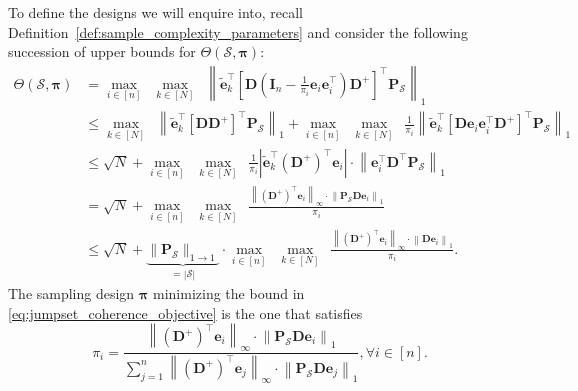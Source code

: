 To define the designs we will enquire into, recall Definition~\ref{def:sample_complexity_parameters} and consider the following succession of upper bounds for $\Theta(\mathcal{S}, \bm{\pi})$:
\begin{align}
    \Theta (\mathcal{S}, \bm{\pi}) & = \underset{i \in [n]}{\max} \enspace \underset{k \in [N]}{\max} \enspace \left \| \tilde{\mathbf{e}}_k^{\top} \left [ \mathbf{D} \left ( \mathbf{I}_n - \frac{1}{\pi_{i}}\mathbf{e}_{i} \mathbf{e}_{i}^\top \right ) \mathbf{D}^{+} \right ]^\top \mathbf{P}_{\mathcal{S}}\right \|_{1} \nonumber \\
    & \leq \underset{k \in [N]}{\max} \enspace \left \| \tilde{\mathbf{e}}_k^{\top} \left [ \mathbf{D} \mathbf{D}^{+} \right ]^\top \mathbf{P}_{\mathcal{S}}\right \|_{1} + \underset{i \in [n]}{\max} \enspace \underset{k \in [N]}{\max} \enspace \frac{1}{\pi_i} \left \| \tilde{\mathbf{e}}_k^{\top} \left [ \mathbf{D} \mathbf{e}_{i} \mathbf{e}_{i}^\top \mathbf{D}^{+} \right ]^\top \mathbf{P}_{\mathcal{S}}\right \|_{1} \nonumber \\
    & \leq \sqrt{N} + \underset{i \in [n]}{\max} \enspace \underset{k \in [N]}{\max} \enspace \frac{1}{\pi_i} \left | \tilde{\mathbf{e}}_k^{\top} (\mathbf{D}^{+})^{\top} \mathbf{e}_{i} \right | \cdot \left \| \mathbf{e}_{i}^\top \mathbf{D}^{\top} \mathbf{P}_{\mathcal{S}}\right \|_{1} \nonumber \\
    & = \sqrt{N}  + \underset{i \in [n]}{\max} \enspace \underset{k \in [N]}{\max} \enspace \frac{\left \| (\mathbf{D}^{+})^{\top} \mathbf{e}_{i} \right \|_{\infty} \cdot \left \| \mathbf{P}_{\mathcal{S}} \mathbf{D} \mathbf{e}_{i} \right \|_{1}}{\pi_i} \label{eq:jumpset_coherence_objective}  \\
    & \leq \sqrt{N} + \underbrace{\|\mathbf{P}_{\mathcal{S}} \|_{1 \to 1}}_{= |\mathcal{S}|} \cdot \underset{i \in [n]}{\max} \enspace \underset{k \in [N]}{\max} \enspace \frac{\left \| (\mathbf{D}^{+})^{\top} \mathbf{e}_{i} \right \|_{\infty} \cdot \left \| \mathbf{D} \mathbf{e}_{i} \right \|_{1}}{\pi_i}. \label{eq:naive_coherence_objective}
\end{align}
The sampling design $\bm{\pi}$ minimizing the bound in \eqref{eq:jumpset_coherence_objective} is the one that satisfies
\begin{equation}
    \pi_i = \frac{\left \| (\mathbf{D}^{+})^{\top} \mathbf{e}_{i} \right \|_{\infty} \cdot \left \| \mathbf{P}_{\mathcal{S}} \mathbf{D} \mathbf{e}_{i} \right \|_{1}}{\sum_{j=1}^{n} \left \| (\mathbf{D}^{+})^{\top} \mathbf{e}_{j} \right \|_{\infty} \cdot \left \| \mathbf{P}_{\mathcal{S}} \mathbf{D} \mathbf{e}_{j} \right \|_{1}}, \forall i \in [n].
    \label{eq:jump_set_coherence_probabilities}
\end{equation}
